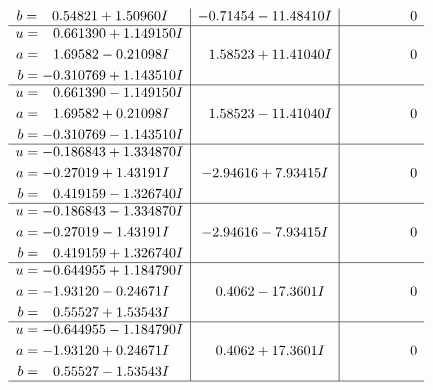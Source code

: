 \documentclass[1p]{elsarticle_modified}
\theoremstyle{definition}
\begin{document}
$$\begin{array}{c|c|c}
\begin{aligned}
b &= \phantom{-}0.54821 + 1.50960 I\end{aligned}
 & -0.71454 - 11.48410 I & \phantom{-0.000000 } 0 \\ \hline\begin{aligned}
u &= \phantom{-}0.661390 + 1.149150 I \\
a &= \phantom{-}1.69582 - 0.21098 I \\
b &= -0.310769 + 1.143510 I\end{aligned}
 & \phantom{-}1.58523 + 11.41040 I & \phantom{-0.000000 } 0 \\ \hline\begin{aligned}
u &= \phantom{-}0.661390 - 1.149150 I \\
a &= \phantom{-}1.69582 + 0.21098 I \\
b &= -0.310769 - 1.143510 I\end{aligned}
 & \phantom{-}1.58523 - 11.41040 I & \phantom{-0.000000 } 0 \\ \hline\begin{aligned}
u &= -0.186843 + 1.334870 I \\
a &= -0.27019 + 1.43191 I \\
b &= \phantom{-}0.419159 - 1.326740 I\end{aligned}
 & -2.94616 + 7.93415 I & \phantom{-0.000000 } 0 \\ \hline\begin{aligned}
u &= -0.186843 - 1.334870 I \\
a &= -0.27019 - 1.43191 I \\
b &= \phantom{-}0.419159 + 1.326740 I\end{aligned}
 & -2.94616 - 7.93415 I & \phantom{-0.000000 } 0 \\ \hline\begin{aligned}
u &= -0.644955 + 1.184790 I \\
a &= -1.93120 - 0.24671 I \\
b &= \phantom{-}0.55527 + 1.53543 I\end{aligned}
 & \phantom{-}0.4062 - 17.3601 I & \phantom{-0.000000 } 0 \\ \hline\begin{aligned}
u &= -0.644955 - 1.184790 I \\
a &= -1.93120 + 0.24671 I \\
b &= \phantom{-}0.55527 - 1.53543 I\end{aligned}
 & \phantom{-}0.4062 + 17.3601 I & \phantom{-0.000000 } 0\\
 \hline 
 \end{array}$$\newpage$$\begin{array}{c|c|c}  

\end{array}$$
\end{document}
